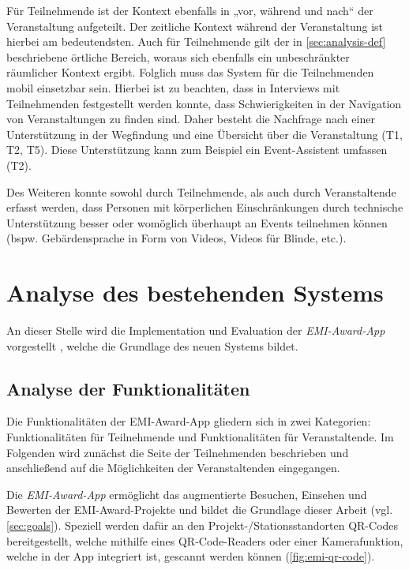 Für Teilnehmende ist der Kontext ebenfalls in „vor, während und nach“ der
Veranstaltung aufgeteilt. Der zeitliche Kontext während der Veranstaltung ist
hierbei am bedeutendsten. Auch für Teilnehmende gilt der in
\autoref{sec:analysis-def} beschriebene örtliche Bereich, woraus sich ebenfalls
ein unbeschränkter räumlicher Kontext ergibt. Folglich muss das System für die
Teilnehmenden mobil einsetzbar sein. Hierbei ist zu beachten, dass in Interviews
mit Teilnehmenden festgestellt werden konnte, dass Schwierigkeiten in der
Navigation von Veranstaltungen zu finden sind. Daher besteht die Nachfrage nach
einer Unterstützung in der Wegfindung und eine Übersicht über die Veranstaltung
(T1, T2, T5). Diese Unterstützung kann zum Beispiel ein Event-Assistent umfassen
(T2).

Des Weiteren konnte sowohl durch Teilnehmende, als auch durch Veranstaltende
erfasst werden, dass Personen mit körperlichen Einschränkungen durch technische
Unterstützung besser oder womöglich überhaupt an Events teilnehmen können (bspw.
Gebärdensprache in Form von Videos, Videos für Blinde, etc.).

\section{Analyse des bestehenden Systems} \label{sec:analysis-old}

An dieser Stelle wird die Implementation und Evaluation der
\textit{EMI-Award-App} vorgestellt \cite{Canzler2021}, welche die Grundlage des neuen Systems bildet.



\subsection{Analyse der Funktionalitäten} \label{ssec:analysis-old-funk}

Die Funktionalitäten der EMI-Award-App gliedern sich in zwei Kategorien:
Funktionalitäten für Teilnehmende und Funktionalitäten für Veranstaltende. Im
Folgenden wird zunächst die Seite der Teilnehmenden beschrieben und anschließend
auf die Möglichkeiten der Veranstaltenden eingegangen.

Die \textit{EMI-Award-App} ermöglicht das augmentierte Besuchen, Einsehen und
Bewerten der EMI-Award-Projekte und bildet die Grundlage dieser Arbeit (vgl.
\autoref{sec:goals}). Speziell werden dafür an den Projekt-/Stationsstandorten
QR-Codes bereitgestellt, welche mithilfe eines QR-Code-Readers oder einer
Kamerafunktion, welche in der App integriert ist, gescannt werden können (\autoref{fig:emi-qr-code}).

